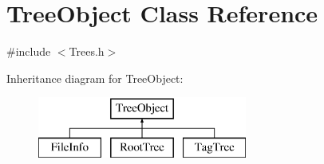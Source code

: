 \hypertarget{class_tree_object}{}\section{Tree\+Object Class Reference}
\label{class_tree_object}


{\ttfamily \#include $<$Trees.\+h$>$}

Inheritance diagram for Tree\+Object\+:\begin{figure}[H]
\begin{center}
\leavevmode
\includegraphics[height=2.000000cm]{class_tree_object}
\end{center}
\end{figure}
